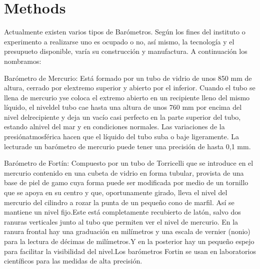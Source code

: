 		\section{Methods}
Actualmente existen varios tipos de Barómetros. Según los fines del instituto o experimento a realizarse uno es ocupado o no, así mismo, la tecnología y el presupueto disponible, varía su construcción y manufactura. A continuación los nombramos:\\


\begin{compactitem}
	\item Barómetro de Mercurio:
	Está formado por un tubo de vidrio de unos 850 mm de altura, cerrado por elextremo superior y abierto por el inferior. Cuando el tubo se llena de mercurio yse coloca el extremo abierto en un recipiente lleno del mismo líquido, el niveldel tubo cae hasta una altura de unos 760 mm por encima del nivel delrecipiente y deja un vacío casi perfecto en la parte superior del tubo, estando alnivel del mar y en condiciones normales. Las variaciones de la presiónatmosférica hacen que el líquido del tubo suba o baje ligeramente. La lecturade un barómetro de mercurio puede tener una precisión de hasta 0,1 mm.\\
	
	
	\item Barómetro de Fortín:
	Compuesto por un tubo de Torricelli que se introduce en el mercurio contenido en una cubeta de vidrio en forma tubular, provista de una base de piel de gamo cuya forma puede ser modificada por medio de un tornillo que se apoya en su centro y que, oportunamente girado, lleva el nivel del mercurio del cilindro a rozar la punta de un pequeño cono de marfil. Así se mantiene un nivel fijo.Este está completamente recubierto de latón, salvo dos ranuras verticales junto al tubo que permiten ver el nivel de mercurio. En la ranura frontal hay una graduación en milímetros y una escala de vernier (nonio) para la lectura de décimas de milímetros.Y en la posterior hay un pequeño espejo para facilitar la visibilidad del nivel.Los barómetros Fortin se usan en laboratorios científicos para las medidas de alta precisión.\\
	

\end{compactitem}
